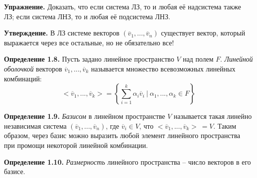 \documentclass[a4paper, 12pt]{article}
\begin{document}
\begin{spacing}{1.5}
\textbf{Упражнение.} Доказать, что если система ЛЗ, то и любая её надсистема также ЛЗ; если система ЛНЗ, то и любая её подсистема ЛНЗ.

\textbf{Утверждение.} В ЛЗ системе векторов $(\overline{v}_1, ..., \overline{v}_n)$ существует вектор, который выражается через все остальные, но не обязательно все!

\textbf{Определение 1.8.} Пусть задано линейное пространство $V$ над полем $F$. \textit{Линейной оболочкой} векторов $\overline{v}_1, ..., \overline{v}_k$ называется множество всевозможных линейных комбинаций:
$$< \overline{v}_1, ..., \overline{v}_k > = \left\{ \sum_{i=1}^k \alpha_i \overline{v}_i \ | \ \alpha_1, ..., \alpha_k \in F \right\}$$

\textbf{Определение 1.9.} \textit{Базисом} в линейном пространстве $V$ называется такая линейно независимая система $(\overline{v}_1, ..., \overline{v}_n)$, где $\overline{v}_i \in V$, что $< \overline{v}_1, ..., \overline{v}_k > \ = V$.
Таким образом, через базис можно выразить любой элемент линейного пространства при промощи некоторой линейной комбинации.

\textbf{Определение 1.10.} \textit{Размерность} линейного пространства -- число векторов в его базисе.

\end{spacing}
\end{document}

